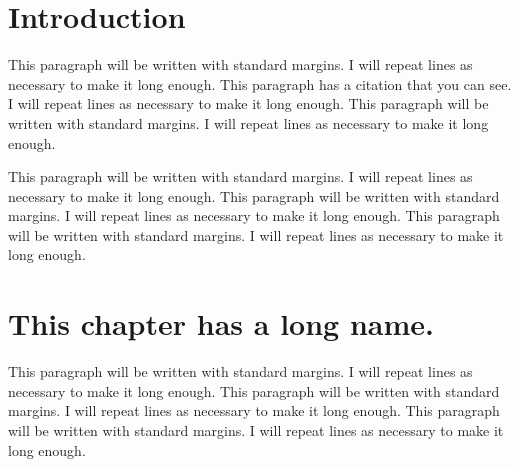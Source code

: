 \documentclass[numbib]{buthesis}  %
\begin{document}
\author{A. Student}
\maketitle
\frontmatter


\tableofcontents

\listoftables

\listoffigures


\mainmatter

\chapter{Introduction}
This paragraph will be written with standard margins. I will repeat
lines as necessary to make it long enough. This paragraph has a 
citation \citep{SMI04} that you can see.
I will repeat lines as necessary to
make it long enough. This paragraph will be written with standard
margins. I will repeat lines as necessary to make it long enough.

This paragraph will be written with standard margins. I will repeat
lines as necessary to make it long enough. This paragraph 
will be written with standard margins. I will repeat lines as necessary to
make it long enough. This paragraph will be written with standard
margins. I will repeat lines as necessary to make it long enough.

\chapter[Long chapter]{This chapter has a long name.}
This paragraph will be written with standard margins. I will repeat
lines as necessary to make it long enough. This paragraph will be
written with standard margins. I will repeat lines as necessary to
make it long enough. This paragraph will be written with standard
margins. I will repeat lines as necessary to make it long enough.
\end{document}
